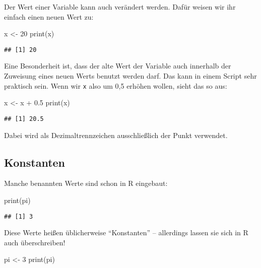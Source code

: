 \documentclass[11pt,german,a4paper]{article}
\newenvironment{Shaded}{\begin{snugshade}}{\end{snugshade}}
\newcommand{\DecValTok}[1]{\textcolor[rgb]{0.00,0.00,0.81}{#1}}
\newcommand{\FloatTok}[1]{\textcolor[rgb]{0.00,0.00,0.81}{#1}}
\newcommand{\FunctionTok}[1]{\textcolor[rgb]{0.00,0.00,0.00}{#1}}
\newcommand{\NormalTok}[1]{#1}
\newcommand{\OtherTok}[1]{\textcolor[rgb]{0.56,0.35,0.01}{#1}}
\newcommand{\SpecialCharTok}[1]{\textcolor[rgb]{0.00,0.00,0.00}{#1}}
\begin{document}
Der Wert einer Variable kann auch verändert werden. Dafür weisen wir ihr einfach einen neuen Wert zu:

\begin{Shaded}
\begin{Highlighting}[]
\NormalTok{x }\OtherTok{\textless{}{-}} \DecValTok{20}
\FunctionTok{print}\NormalTok{(x)}
\end{Highlighting}
\end{Shaded}

\begin{verbatim}
## [1] 20
\end{verbatim}

Eine Besonderheit ist, dass der alte Wert der Variable auch innerhalb der Zuweisung eines neuen Werts benutzt werden darf. Das kann in einem Script sehr praktisch sein. Wenn wir \texttt{x} also um 0,5 erhöhen wollen, sieht das so aus:

\begin{Shaded}
\begin{Highlighting}[]
\NormalTok{x }\OtherTok{\textless{}{-}}\NormalTok{ x }\SpecialCharTok{+} \FloatTok{0.5}
\FunctionTok{print}\NormalTok{(x)}
\end{Highlighting}
\end{Shaded}

\begin{verbatim}
## [1] 20.5
\end{verbatim}

Dabei wird als Dezimaltrennzeichen ausschließlich der Punkt verwendet.

\hypertarget{konstanten}{%
\subsection{Konstanten}\label{konstanten}}

Manche benannten Werte sind schon in R eingebaut:

\begin{Shaded}
\begin{Highlighting}[]
\FunctionTok{print}\NormalTok{(pi)}
\end{Highlighting}
\end{Shaded}

\begin{verbatim}
## [1] 3
\end{verbatim}

Diese Werte heißen üblicherweise ``Konstanten'' -- allerdings lassen sie sich in R auch überschreiben!

\begin{Shaded}
\begin{Highlighting}[]
\NormalTok{pi }\OtherTok{\textless{}{-}} \DecValTok{3}
\FunctionTok{print}\NormalTok{(pi)}
\end{Highlighting}
\end{Shaded}
\end{document}
